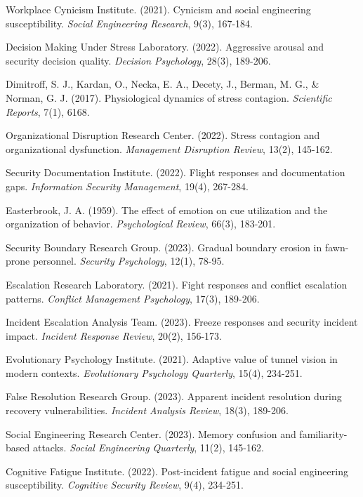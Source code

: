 \documentclass[11pt,a4paper]{article}
\begin{document}
\begin{thebibliography}{99}
Workplace Cynicism Institute. (2021). Cynicism and social engineering susceptibility. \textit{Social Engineering Research}, 9(3), 167-184.

Decision Making Under Stress Laboratory. (2022). Aggressive arousal and security decision quality. \textit{Decision Psychology}, 28(3), 189-206.

Dimitroff, S. J., Kardan, O., Necka, E. A., Decety, J., Berman, M. G., \& Norman, G. J. (2017). Physiological dynamics of stress contagion. \textit{Scientific Reports}, 7(1), 6168.

Organizational Disruption Research Center. (2022). Stress contagion and organizational dysfunction. \textit{Management Disruption Review}, 13(2), 145-162.

Security Documentation Institute. (2022). Flight responses and documentation gaps. \textit{Information Security Management}, 19(4), 267-284.

Easterbrook, J. A. (1959). The effect of emotion on cue utilization and the organization of behavior. \textit{Psychological Review}, 66(3), 183-201.

Security Boundary Research Group. (2023). Gradual boundary erosion in fawn-prone personnel. \textit{Security Psychology}, 12(1), 78-95.

Escalation Research Laboratory. (2021). Fight responses and conflict escalation patterns. \textit{Conflict Management Psychology}, 17(3), 189-206.

Incident Escalation Analysis Team. (2023). Freeze responses and security incident impact. \textit{Incident Response Review}, 20(2), 156-173.

Evolutionary Psychology Institute. (2021). Adaptive value of tunnel vision in modern contexts. \textit{Evolutionary Psychology Quarterly}, 15(4), 234-251.

False Resolution Research Group. (2023). Apparent incident resolution during recovery vulnerabilities. \textit{Incident Analysis Review}, 18(3), 189-206.

Social Engineering Research Center. (2023). Memory confusion and familiarity-based attacks. \textit{Social Engineering Quarterly}, 11(2), 145-162.

Cognitive Fatigue Institute. (2022). Post-incident fatigue and social engineering susceptibility. \textit{Cognitive Security Review}, 9(4), 234-251.


\end{thebibliography}
\end{document}
